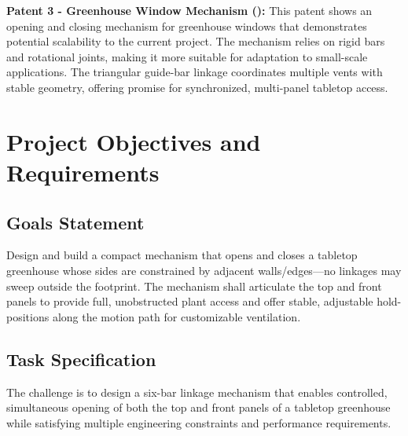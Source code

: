 \documentclass[12pt]{article}
\begin{document}
\textbf{Patent 3 - Greenhouse Window Mechanism (\cite{Bom1978}):} This patent shows an opening and closing mechanism for greenhouse windows that demonstrates potential scalability to the current project. The mechanism relies on rigid bars and rotational joints, making it more suitable for adaptation to small-scale applications. The triangular guide-bar linkage coordinates multiple vents with stable geometry, offering promise for synchronized, multi-panel tabletop access.

\section{Project Objectives and Requirements}
\label{sec:objectives}

\subsection{Goals Statement}
\label{sec:goals}

Design and build a compact mechanism that opens and closes a tabletop greenhouse whose sides are constrained by adjacent walls/edges—no linkages may sweep outside the footprint. The mechanism shall articulate the top and front panels to provide full, unobstructed plant access and offer stable, adjustable hold-positions along the motion path for customizable ventilation.

\subsection{Task Specification}
\label{sec:task_specification}

The challenge is to design a six-bar linkage mechanism that enables controlled, simultaneous opening of both the top and front panels of a tabletop greenhouse while satisfying multiple engineering constraints and performance requirements.
\end{document}
